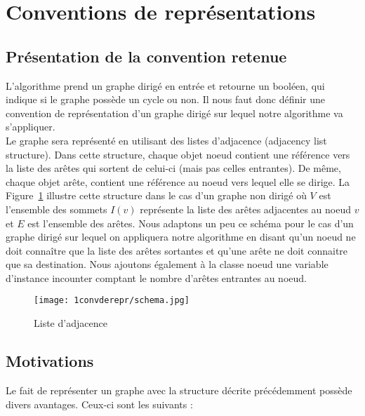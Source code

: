 \section{Conventions de représentations}

\subsection{Présentation de la convention retenue}
L'algorithme prend un graphe dirigé en entrée et retourne un booléen, qui indique si le graphe possède un cycle ou non. Il nous faut donc définir une convention de représentation d'un graphe dirigé sur lequel notre algorithme va s'appliquer. \\

Le graphe sera représenté en utilisant des listes d'adjacence (adjacency list structure). Dans cette structure, chaque objet noeud contient une référence vers la liste des arêtes qui sortent de celui-ci (mais pas celles entrantes). De même, chaque objet arête, contient une référence au noeud vers lequel elle se dirige. La Figure~\ref{schéma} illustre cette structure dans le cas d'un graphe non dirigé où $V$ est l'ensemble des sommets $I(v)$ représente la liste des arêtes adjacentes au noeud $v$ et $E$ est l'ensemble des arêtes. Nous adaptons un peu ce schéma pour le cas d'un graphe dirigé sur lequel on appliquera notre algorithme en disant qu'un noeud ne doit connaître que la liste des arêtes sortantes et qu'une arête ne doit connaitre que sa destination. Nous ajoutons également à la classe noeud une variable d'instance incounter comptant le nombre d'arêtes entrantes au noeud. 

\begin{figure}[!h]
	\centering
         \texttt{[image: 1convderepr/schema.jpg]}
         \label{schéma}
         \caption{Liste d'adjacence}
\end{figure}

\subsection{Motivations}
Le fait de représenter un graphe avec la structure décrite précédemment possède divers avantages. Ceux-ci sont les suivants : \\

